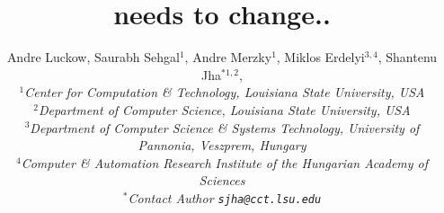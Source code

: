 \documentclass[3p,twocolumn]{elsarticle}
\begin{document}
\title{needs to change..}
\author{Andre Luckow, Saurabh Sehgal$^1$, Andre Merzky$^{1}$, Miklos
  Erdelyi$^{3,4}$, Shantenu Jha$^{*1,2}$,
  \\
  \small{\emph{$^{1}$Center for Computation \& Technology, Louisiana State University, USA}}\\
  \small{\emph{$^{2}$Department of Computer Science, Louisiana State University, USA}}\\
  \small{\emph{$^{3}$Department of Computer Science \& Systems
      Technology, University of
      Pannonia, Veszprem, Hungary}}\\
  \small{\emph{$^{4}$Computer \& Automation Research Institute of the
      Hungarian Academy of
      Sciences}}\\
  \small{\emph{$^{*}$Contact Author \texttt{sjha@cct.lsu.edu}}}
  \upp\upp\upp\upp\upp }

\newif\ifdraft
\drafttrue
\ifdraft
 \newcommand{\amnote}[1]{     {\textcolor{magenta} { ***AM: #1 }}}
 \newcommand{\jhanote}[1]{    {\textcolor{red}     { ***SJ: #1 }}}
 \newcommand{\miklosnote}[1]{ {\textcolor{blue}    { ***ME: #1 }}}
 \newcommand{\ssnote}[1]{     {\textcolor{blue}    { ***SS: #1 }}}
 \newcommand{\alnote}[1]{     {\textcolor{green}    { ***SS: #1 }}}
\else
 \newcommand{\amnote}[1]{}
 \newcommand{\jhanote}[1]{}
 \newcommand{\miklosnote}[1]{}
 \newcommand{\ssnote}[1]{}
  \newcommand{\alnote}[1]{}
\fi

\newcommand{\sagamapreduce}{SAGA-MapReduce\xspace}
\newcommand{\smr}{\sagamapreduce}
\newcommand{\mr}{MapReduce\xspace}
\newcommand{\tc}{$T_c$\xspace}
\newcommand{\wc}{wordcount\xspace}
\newcommand{\Wc}{Wordcount\xspace}

\newcommand{\dn}{\vspace*{0.33em}}
\newcommand{\dnn}{\vspace*{0.66em}}
\newcommand{\dnnn}{\vspace*{1em}}
\newcommand{\uppp}{\vspace*{-1em}}
\newcommand{\upp}{\vspace*{-0.66em}}
\newcommand{\up}{\vspace*{-0.33em}}
\newcommand{\shift}{\hspace*{1.00em}}

\newcommand{\T}[1]{\texttt{#1}}
\newcommand{\I}[1]{\textit{#1}}
\newcommand{\B}[1]{\textbf{#1}}
\newcommand{\F}[1]{\B{[FIXME: #1]}}
\newcommand{\TODO}[1]{\textcolor{red}{\B{TODO: #1}}}
\end{document}
